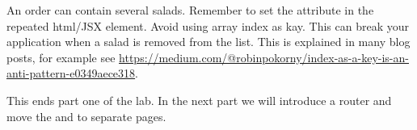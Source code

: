 \documentclass[fleqn, article, a4paper]{memoir}
\begin{document}
\begin{Assignments}
An order can contain several salads. Remember to set the  attribute in the repeated html/JSX element. Avoid using array index as kay. This can break your application when a salad is removed from the list. This is explained in many blog posts, for example see \url{https://medium.com/@robinpokorny/index-as-a-key-is-an-anti-pattern-e0349aece318}.

\item This ends part one of the lab. In the next part we will introduce a router and move the  and  to separate pages.

\end{Assignments}


\end{document}

